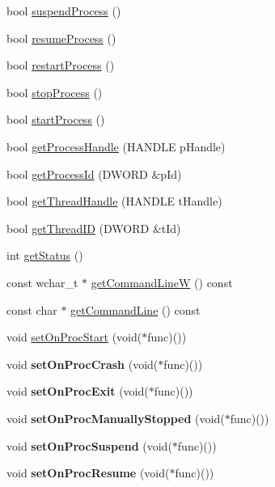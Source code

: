 \begin{DoxyCompactItemize}
bool \hyperlink{class_process_ab4a5b657827c1fbb5e160a5c17bd3eb4}{suspend\+Process} ()
\item 
bool \hyperlink{class_process_a9252b5321058c5031c1898951854df9a}{resume\+Process} ()
\item 
bool \hyperlink{class_process_ab661e31e8b6bf000ff541717ccfeb5f5}{restart\+Process} ()
\item 
bool \hyperlink{class_process_a40f95845ca7480cfe7b232cf0e01cbcf}{stop\+Process} ()
\item 
bool \hyperlink{class_process_a022e8521999513ecab34d68630b1ec49}{start\+Process} ()
\item 
bool \hyperlink{class_process_a0418fee4890e8a2b88880366030eceb9}{get\+Process\+Handle} (H\+A\+N\+D\+L\+E p\+Handle)
\item 
bool \hyperlink{class_process_a7bfaff9eec7a272a6e928b5982891cd4}{get\+Process\+Id} (D\+W\+O\+R\+D \&p\+Id)
\item 
bool \hyperlink{class_process_a652a1458e12aa3ad147a2c120faf80a8}{get\+Thread\+Handle} (H\+A\+N\+D\+L\+E t\+Handle)
\item 
bool \hyperlink{class_process_a41236d63b4c7a3d8885a8335768d6e9d}{get\+Thread\+I\+D} (D\+W\+O\+R\+D \&t\+Id)
\item 
int \hyperlink{class_process_ab704137089b30d1e9593231ec78eaa2d}{get\+Status} ()
\item 
const wchar\+\_\+t $\ast$ \hyperlink{class_process_a889ea0a3e89d28f018e2a9c0bd65fc79}{get\+Command\+Line\+W} () const 
\item 
const char $\ast$ \hyperlink{class_process_a28f9d603f812b25bbe354cfeb1b9bb2a}{get\+Command\+Line} () const 
\item 
void \hyperlink{class_process_a70b4666b10995920204f41bc08e9a8ea}{set\+On\+Proc\+Start} (void($\ast$func)())
\item 
\hypertarget{class_process_a26689f3549ab9cbf5be2c5fd57f87045}{void {\bfseries set\+On\+Proc\+Crash} (void($\ast$func)())}\label{class_process_a26689f3549ab9cbf5be2c5fd57f87045}

\item 
\hypertarget{class_process_a4a1f587c85b923d01989daf538a9b07d}{void {\bfseries set\+On\+Proc\+Exit} (void($\ast$func)())}\label{class_process_a4a1f587c85b923d01989daf538a9b07d}

\item 
\hypertarget{class_process_a1c458ef0bb7ac130e9e54506af8b8f97}{void {\bfseries set\+On\+Proc\+Manually\+Stopped} (void($\ast$func)())}\label{class_process_a1c458ef0bb7ac130e9e54506af8b8f97}

\item 
\hypertarget{class_process_a48d5090164a9d9a0736b8f55529c97eb}{void {\bfseries set\+On\+Proc\+Suspend} (void($\ast$func)())}\label{class_process_a48d5090164a9d9a0736b8f55529c97eb}

\item 
\hypertarget{class_process_a2763232d6b1f2da70aff0de9568ad35e}{void {\bfseries set\+On\+Proc\+Resume} (void($\ast$func)())}\label{class_process_a2763232d6b1f2da70aff0de9568ad35e}

\end{DoxyCompactItemize}
